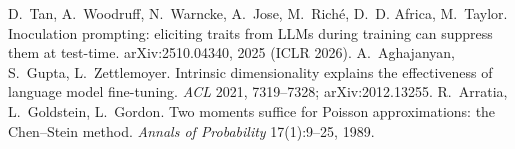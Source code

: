  D.~Tan, A.~Woodruff, N.~Warncke, A.~Jose, M.~Rich\'e, D.~D. Africa, M.~Taylor. Inoculation prompting: eliciting traits from LLMs during training can suppress them at test-time. arXiv:2510.04340, 2025 (ICLR 2026).
 A.~Aghajanyan, S.~Gupta, L.~Zettlemoyer. Intrinsic dimensionality explains the effectiveness of language model fine-tuning. \emph{ACL} 2021, 7319--7328; arXiv:2012.13255.
 R.~Arratia, L.~Goldstein, L.~Gordon. Two moments suffice for Poisson approximations: the Chen--Stein method. \emph{Annals of Probability} 17(1):9--25, 1989.

